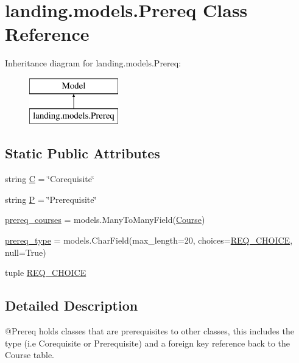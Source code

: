 \hypertarget{classlanding_1_1models_1_1Prereq}{}\section{landing.\+models.\+Prereq Class Reference}
\label{classlanding_1_1models_1_1Prereq}
Inheritance diagram for landing.\+models.\+Prereq\+:\begin{figure}[H]
\begin{center}
\leavevmode
\includegraphics[height=2.000000cm]{classlanding_1_1models_1_1Prereq}
\end{center}
\end{figure}
\subsection*{Static Public Attributes}
\begin{DoxyCompactItemize}
\item 
string \mbox{\hyperlink{classlanding_1_1models_1_1Prereq_ab8f9e1e86370dc76c689d122c2910982}{C}} = \char`\"{}Corequisite\char`\"{}
\item 
string \mbox{\hyperlink{classlanding_1_1models_1_1Prereq_ab99082a563d5a9e30793d92d38cf4b5a}{P}} = \char`\"{}Prerequisite\char`\"{}
\item 
\mbox{\hyperlink{classlanding_1_1models_1_1Prereq_a4e83c57d21589b742a3bd537e64c9263}{prereq\+\_\+courses}} = models.\+Many\+To\+Many\+Field(\mbox{\hyperlink{classlanding_1_1models_1_1Course}{Course}})
\item 
\mbox{\hyperlink{classlanding_1_1models_1_1Prereq_a32ccec77ab248409d6aecb58de5d57bb}{prereq\+\_\+type}} = models.\+Char\+Field(max\+\_\+length=20, choices=\mbox{\hyperlink{classlanding_1_1models_1_1Prereq_a04e7ec750245a108149ff8680c846509}{R\+E\+Q\+\_\+\+C\+H\+O\+I\+CE}}, null=True)
\item 
tuple \mbox{\hyperlink{classlanding_1_1models_1_1Prereq_a04e7ec750245a108149ff8680c846509}{R\+E\+Q\+\_\+\+C\+H\+O\+I\+CE}}
\end{DoxyCompactItemize}


\subsection{Detailed Description}
\begin{DoxyVerb}@Prereq  holds classes that are prerequisites to other classes,
        this includes the type (i.e Corequisite or Prerequisite) and a foreign key reference
        back to the Course table.
\end{DoxyVerb}
 

